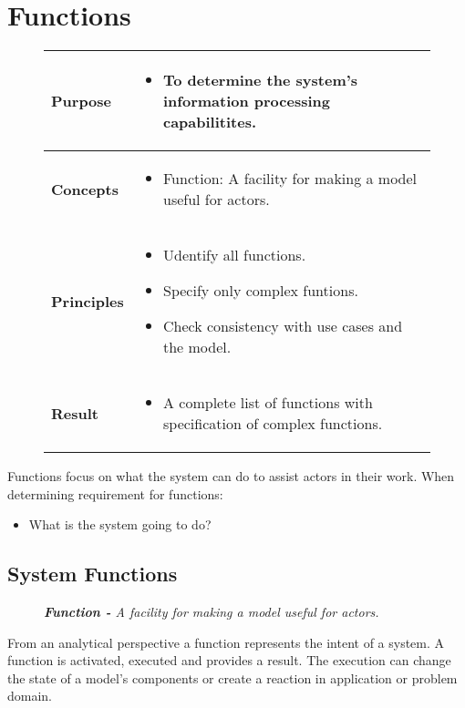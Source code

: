 \chapter{Functions \ooad[139]}
\begin{figure}[H]
    \begin{tabular}{|l|p{12cm}|}
        \hline
        \textbf{Purpose} & \begin{itemize}
            \item To determine the system's information processing capabilitites.
        \end{itemize} \\\hline
        \textbf{Concepts} & \begin{itemize}
            \item Function: A facility for making a model useful for actors.
        \end{itemize} \\\hline
        \textbf{Principles} & \begin{itemize}
            \item Udentify all functions.
            \item Specify only complex funtions.
            \item Check consistency with use cases and the model.
        \end{itemize} \\\hline
        \textbf{Result} & \begin{itemize}
            \item A complete list of functions with specification of complex functions.
        \end{itemize} \\\hline
    \end{tabular}
\end{figure}
Functions focus on what the system can do to assist actors in their work.
When determining requirement for functions:
\begin{itemize}
    \item What is the system going to do?
\end{itemize}
\section{System Functions\ooad[139]}
\begin{figure}[H]
    \textit{\textbf{Function -} A facility for making a model useful for actors.}
\end{figure}
From an analytical perspective a function represents the intent of a system. A function is activated, executed and provides a result. The execution can change the state of a model's components or create a reaction in application or problem domain.
